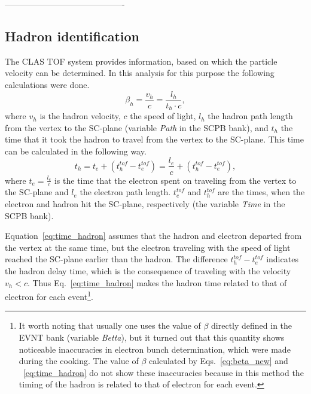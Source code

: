 -------------------------------------------


\subsection{Hadron identification}
\label{Sect:hadr_id}

The CLAS TOF system provides information, based on which the particle velocity can be determined. In this analysis for this purpose the following calculations were done.
\begin{equation}
\beta_{h} =\frac{v_{h}}{c}=\frac{l_{h}}{t_{h}\cdot c},
\label{eq:beta_new}
\end{equation}
where $v_{h}$ is the hadron velocity, $c$ the speed of light, $l_{h}$ the hadron path length from the vertex to the SC-plane (variable \textit{Path} in the SCPB bank), and $t_{h}$ the time that it took the hadron to travel from the vertex to the SC-plane. This time can be calculated in the following way. 
\begin{equation}
t_{h} = t_{e} + (t^{tof}_{h}- t^{tof}_{e}) = \frac{l_{e}}{c} + (t^{tof}_{h}- t^{tof}_{e})  ,
\label{eq:time_hadron}
\end{equation}
where $t_{e} = \frac{l_{e}}{c}$ is the time that the electron spent on traveling from the vertex to the SC-plane and $l_{e}$ the electron path length. $t^{tof}_{e}$ and $t^{tof}_{h}$ are the times, when the electron and hadron hit the SC-plane, respectively (the variable \textit{Time} in the SCPB bank).

Equation~\eqref{eq:time_hadron} assumes that the hadron and electron departed from the vertex at the same time, but the electron traveling with the speed of light reached the SC-plane earlier than the hadron. The difference $t^{tof}_{h} - t^{tof}_{e}$ indicates the hadron delay time, which is the consequence of traveling with the velocity $v_{h}<c$. Thus Eq.~\eqref{eq:time_hadron} makes the hadron time related to that of electron for each event\footnote[5]{It worth noting that usually one uses the value of $\beta$ directly defined in the EVNT bank (variable \textit{Betta}), but it turned out that this quantity shows noticeable inaccuracies in electron bunch determination, which were made during the cooking. The value of $\beta$ calculated by Eqs.~\eqref{eq:beta_new} and ~\eqref{eq:time_hadron} do not show these inaccuracies because in this method the timing of the hadron is related to that of electron for each event. }.  

